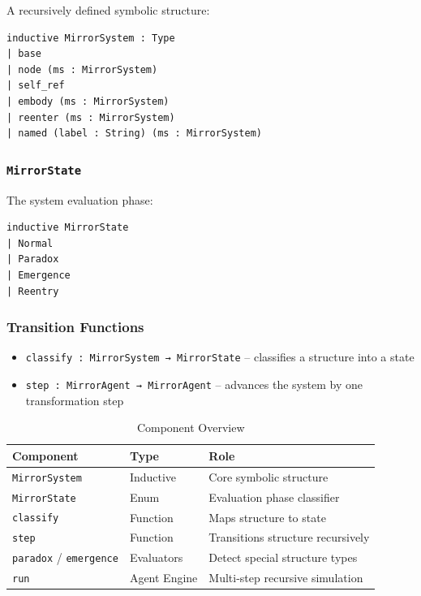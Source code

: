 \documentclass[manuscript,nonacm]{acmart}
\begin{document}
A recursively defined symbolic structure:

\begin{verbatim}
inductive MirrorSystem : Type
| base
| node (ms : MirrorSystem)
| self_ref
| embody (ms : MirrorSystem)
| reenter (ms : MirrorSystem)
| named (label : String) (ms : MirrorSystem)
\end{verbatim}

\subsubsection{\texttt{MirrorState}}

The system evaluation phase:

\begin{verbatim}
inductive MirrorState
| Normal 
| Paradox 
| Emergence 
| Reentry
\end{verbatim}

\subsubsection{Transition Functions}

\begin{itemize}
\item \texttt{classify : MirrorSystem → MirrorState} – classifies a structure into a state
\item \texttt{step : MirrorAgent → MirrorAgent} – advances the system by one transformation step
\end{itemize}

\begin{table}[H]
  \caption{Component Overview}
  \label{tab:component-overview}
  \begin{tabular}{@{}lll@{}}
    \toprule
    \textbf{Component} & \textbf{Type} & \textbf{Role} \\
    \midrule
    \texttt{MirrorSystem} & Inductive & Core symbolic structure \\
    \texttt{MirrorState} & Enum & Evaluation phase classifier \\
    \texttt{classify} & Function & Maps structure to state \\
    \texttt{step} & Function & Transitions structure recursively \\
    \texttt{paradox} / \texttt{emergence} & Evaluators & Detect special structure types \\
    \texttt{run} & Agent Engine & Multi-step recursive simulation \\
    \bottomrule
  \end{tabular}
\end{table}
\end{document}
